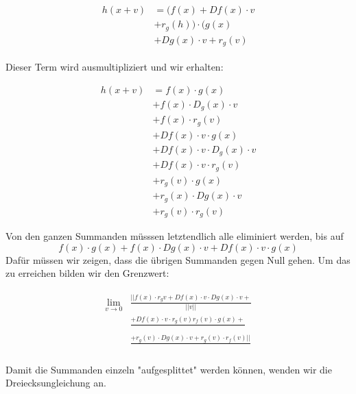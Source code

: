 \begin{align} \begin{split} h(x+v) & = (f(x) + Df(x) \cdot v \\ & + r_{g}(h)) \cdot (g(x) \\ & + Dg(x) \cdot v + r_{g}(v) \end{split} \end{align}

Dieser Term wird ausmultipliziert und wir erhalten: 

\begin{equation*}
\begin{split} h(x+v) & = f(x) \cdot g(x) \\ & + f(x)  \cdot D_{g}(x) \cdot v \\ & + f(x) \cdot r_{g}(v) \\ & + Df(x) \cdot v \cdot g(x) \\ & +  Df(x) \cdot v \cdot D_{g}(x) \cdot v  \\ & + Df(x) \cdot v \cdot r_{g}(v) \\ & +  r_{g}(v) \cdot g(x) \\ & + r_{g}(x) \cdot Dg(x) \cdot v \\ & + r_{g}(v) \cdot r_{g}(v) \end{split} \end{equation*}   %

Von den ganzen Summanden müsssen letztendlich alle eliminiert werden, bis auf 
\begin{equation*} f(x) \cdot g(x) + f(x) \cdot Dg(x) \cdot v + Df(x) \cdot v \cdot g(x) \end{equation*} 
Dafür müssen wir zeigen, dass die übrigen Summanden gegen Null gehen. Um das zu erreichen bilden wir den Grenzwert:

\begin{align}
\begin{split}
\lim \limits_{v \rightarrow 0} &\frac{||f(x) \cdot r_{g}v + Df(x) \cdot v \cdot Dg(x) \cdot v +}{||v||}\\
&\frac{+ Df(x) \cdot v \cdot r_{g}(v) r_{f}(v) \cdot g(x) +}{}\\
&\frac{+ r_{g}(v) \cdot Dg(x) \cdot v + r_{g}(v) \cdot r_{f}(v)||}{}
\end{split}
\end{align}

Damit die Summanden einzeln "aufgesplittet" werden können, wenden wir die Dreiecksungleichung %
an.

